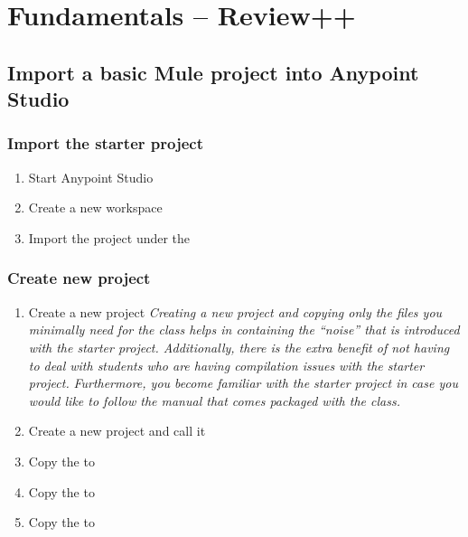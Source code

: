 \chapter{Fundamentals -- Review++}
\section{Import a basic Mule project into Anypoint Studio}
\subsection{Import the starter project}
\begin{enumerate}
\item Start Anypoint Studio
\item Create a new workspace
\item Import the  project under the 
\end{enumerate}
\subsection{Create new project}
\begin{enumerate}[resume*]
\item Create a new project
  \newline
  \emph{
    Creating a new project and copying only the files you minimally need for the class helps in containing the ``noise'' that is introduced with the starter project.  Additionally, there is the extra benefit of not having to deal with students who are having compilation issues with the starter project.
  }
  \newline
  \emph{
    Furthermore, you become familiar with the starter project in case you would like to follow the manual that comes packaged with the class.
  }
\item Create a new project and call it 
\item Copy the  to 
\item Copy the  to 
\item Copy the  to 
\end{enumerate}

